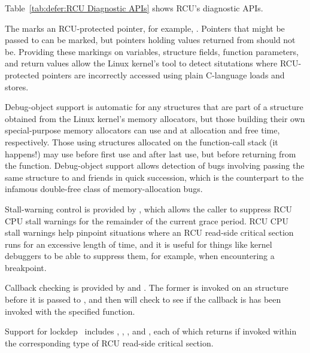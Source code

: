 Table~\ref{tab:defer:RCU Diagnostic APIs}
shows RCU's diagnostic APIs.

The  marks an RCU-protected pointer, for example,
.
Pointers that might be passed to  can be marked,
but pointers holding values returned from 
should not be.
Providing these markings on variables, structure fields, function
parameters, and return values allow the Linux kernel's 
tool to detect situtations where RCU-protected pointers are
incorrectly accessed using plain C-language loads and stores.

Debug-object support is automatic for any  structures
that are part of a structure obtained from the Linux kernel's
memory allocators, but those building their own special-purpose
memory allocators can use  and 
at allocation and free time, respectively.
Those using  structures allocated on the function-call
stack (it happens!) may use 
before first use and  after last use,
but before returning from the function.
Debug-object support allows detection of bugs involving passing the
same  structure to  and friends in
quick succession, which is the  counterpart to the
infamous double-free class of memory-allocation bugs.

Stall-warning control is provided by , which
allows the caller to suppress RCU CPU stall warnings for the remainder
of the current grace period.
RCU CPU stall warnings help pinpoint situations where an RCU read-side
critical section runs for an excessive length of time, and it is useful
for things like kernel debuggers to be able to suppress them, for example,
when encountering a breakpoint.

Callback checking is provided by  and
.
The former is invoked on an  structure before it is passed
to , and then  will
check to see if the callback is has been invoked with the specified
function.

Support for lockdep~\cite{JonathanCorbet2006lockdep} includes
,
,
, and
,
each of which returns  if invoked within the corresponding
type of RCU read-side critical section.


